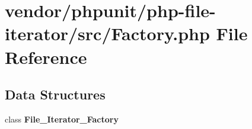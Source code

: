 \section{vendor/phpunit/php-\/file-\/iterator/src/\+Factory.php File Reference}
\label{phpunit_2php-file-iterator_2src_2_factory_8php}
\subsection*{Data Structures}
\begin{DoxyCompactItemize}
\item 
class {\bf File\+\_\+\+Iterator\+\_\+\+Factory}
\end{DoxyCompactItemize}
